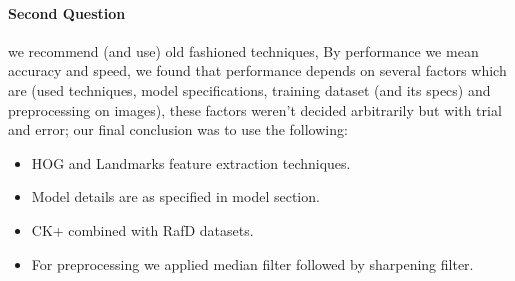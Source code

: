 \paragraph{Second Question}
we recommend (and use) old fashioned techniques, By performance we mean accuracy and speed, we found that performance depends on
several factors which are (used techniques, model specifications, training dataset (and its specs) and preprocessing on images), these factors weren't decided arbitrarily but with trial and error; our final conclusion was to use the following:
\begin{itemize}
	\item HOG and Landmarks feature extraction techniques.
	\item Model details are as specified in model section.
	\item CK+ combined with RafD datasets.
	\item For preprocessing we applied median filter followed by sharpening filter.
\end{itemize}